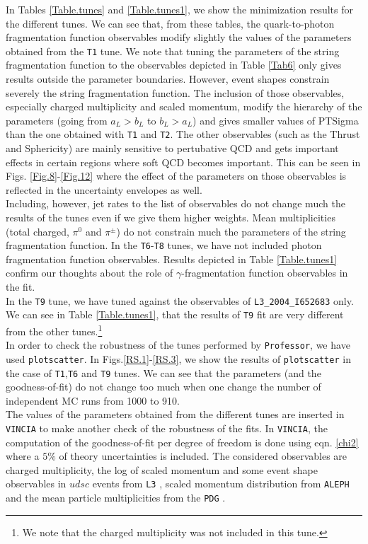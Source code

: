 \documentclass[aps,preprint,floatfix,nofootinbib,showpacs]{revtex4-1}
\begin{document}
In Tables \ref{Table.tunes} and \ref{Table.tunes1}, we show 
the minimization results for the different tunes. We can see 
that, from these tables, the quark-to-photon fragmentation
function observables modify slightly the values of the parameters
obtained from the \texttt{T1} tune.
We note that tuning the parameters of the string fragmentation 
function to the observables depicted in Table \ref{Tab6} only 
gives results outside the parameter boundaries. However, event
shapes constrain severely the string fragmentation function. 
The inclusion of those  observables, especially charged multiplicity 
and scaled momentum, modify the hierarchy of the parameters 
(going from $a_L > b_L$ to $b_L > a_L$) and gives smaller 
values of \textsf{PTSigma} than the one obtained with 
\texttt{T1} and \texttt{T2}. The other observables (such
as the Thrust and Sphericity) are mainly sensitive 
to pertubative QCD and gets important effects in certain
regions where soft QCD becomes important. 
This can be seen in Figs. \ref{Fig.8}-\ref{Fig.12} where 
the effect of the parameters on those observables is reflected 
in the uncertainty envelopes as well. \\
Including, however, jet rates to the list of observables do not
change much the results of the tunes even if we give them 
higher weights. Mean multiplicities (total charged, $\pi^0$ and 
$\pi^\pm$) do not constrain much the parameters of the string 
fragmentation function. In the \texttt{T6}-\texttt{T8} tunes, 
we have not included photon fragmentation function observables. 
Results depicted in Table \ref{Table.tunes1} confirm our thoughts 
about the role of $\gamma$-fragmentation function observables 
in the fit. \\
In the \texttt{T9} tune, we have tuned against the observables 
of \texttt{L3\_2004\_I652683} only. We can see in Table 
\ref{Table.tunes1}, that the results of \texttt{T9} fit are
very different from the other tunes.\footnote{We note that the 
charged multiplicity was not included in this tune.} \\
In order to check the robustness of the tunes performed by 
\texttt{Professor}, we have used \texttt{plotscatter}. 
In Figs.\ref{RS.1}-\ref{RS.3}, we show the results of 
\texttt{plotscatter} in the case of \texttt{T1},\texttt{T6} 
and \texttt{T9} tunes. We can see that the parameters (and the 
goodness-of-fit) do not change too much when one change the 
number of independent MC runs from 1000  to 910. \\
The values of the parameters obtained from the different
tunes are inserted in \texttt{VINCIA} to make another 
check of the robustness of the fits. In \texttt{VINCIA}, 
the computation of the goodness-of-fit per degree of 
freedom is done using eqn. \ref{chi2} where a $5\%$ of 
theory uncertainties is included. The considered observables 
are charged multiplicity, the log of scaled
momentum and some event shape observables in $udsc$ events 
from \texttt{L3} \cite{Achard:2004sv}, scaled momentum 
distribution from \texttt{ALEPH} \cite{} and the mean 
particle multiplicities from the \texttt{PDG} \cite{Amsler:2008zzb}.
\end{document}
